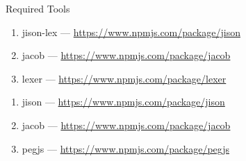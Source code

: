 \documentclass[landscape, 11pt]{article}
\begin{document}
\begin{qsection}{Required Tools}

	\begin{enumerate}
		 \br

			\begin{enumerate}[label=\alph*.]
				\item jison-lex	---	\href{https://www.npmjs.com/package/jison}{https://www.npmjs.com/package/jison}
				\item jacob		---	\href{https://www.npmjs.com/package/jacob}{https://www.npmjs.com/package/jacob}
				\item lexer		---	\href{https://www.npmjs.com/package/lexer}{https://www.npmjs.com/package/lexer}
			\end{enumerate} \br

		 \br

			\begin{enumerate}[label=\alph*.]
				\item jison	---	\href{https://www.npmjs.com/package/jison}{https://www.npmjs.com/package/jison}
				\item jacob	---	\href{https://www.npmjs.com/package/jacob}{https://www.npmjs.com/package/jacob}
				\item pegjs	---	\href{https://www.npmjs.com/package/pegjs}{https://www.npmjs.com/package/pegjs}
			\end{enumerate}
	\end{enumerate}

\end{qsection}
\end{document}
